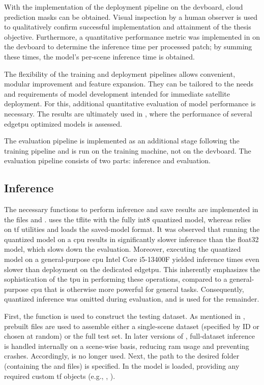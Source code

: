 {With the implementation of the deployment pipeline on the \gls{devboard}, cloud prediction masks can be obtained.
Visual inspection by a human observer is used to qualitatively confirm successful implementation and attainment of the thesis objective.
Furthermore, a quantitative performance metric was implemented in  on the \gls{devboard} to determine the inference time per processed patch;
by summing these times, the model's per-scene inference time is obtained.

The flexibility of the training and deployment pipelines allows convenient, modular improvement and feature expansion.
They can be tailored to the needs and requirements of model development intended for immediate satellite deployment.
For this, additional quantitative evaluation of model performance is necessary. The results are ultimately used in ,
where the performance of several \gls{edgetpu} optimized models is assessed.

The evaluation pipeline is implemented as an additional stage following the training pipeline and is run on the training machine, not on the \gls{devboard}.
The evaluation pipeline consists of two parts: inference and evaluation.

\subsection*{Inference}

The necessary functions to perform inference and save results are implemented in the files  and .
 uses the \gls{tflite}  with the fully \gls{int8} quantized  model,
whereas  relies on \gls{tf} utilities and loads the  saved-model format.
It was observed that running the quantized model on a \gls{cpu} results in significantly slower inference than the \gls{float32}  model, which slows down the evaluation.
Moreover, executing the quantized model on a general-purpose \gls{cpu} Intel Core i5-13400F yielded inference times even slower than deployment on the dedicated \gls{edgetpu}.
This inherently emphasizes the sophistication of the \gls{tpu} in performing these operations, compared to a general-purpose \gls{cpu} that is otherwise more powerful for general tasks.
Consequently, quantized inference was omitted during evaluation, and  is used for the remainder.

First, the  function is used to construct the testing dataset.
As mentioned in , prebuilt  files are used to assemble either a single-scene dataset (specified by ID or chosen at random) or the full test set.
In later versions of , full-dataset inference is handled internally on a scene-wise basis, reducing \gls{ram} usage and preventing crashes.
Accordingly,  is no longer used.
Next, the path to the desired  folder (containing the  and  files) is specified.
In  the  model is loaded, providing any required custom \gls{tf} objects (e.g., , ).

}
